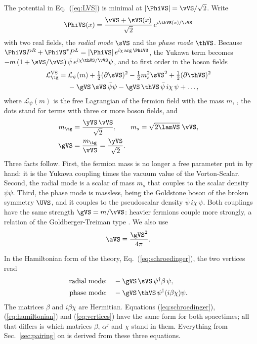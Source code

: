 The potential in Eq.~(\ref{eq:LVS}) is minimal at $|\PhiVS|=\vVS/\sqrt2$. Write
\begin{equation}
\PhiVS(x)=\frac{\vVS+\sVS(x)}{\sqrt2}\,e^{i\thVS(x)/\vVS}
\label{eq:polar}
\end{equation}
with two real fields, the \emph{radial mode} $\sVS$ and the \emph{phase mode} $\thVS$. Because
$\PhiVS P^{R}+\PhiVS^*P^{L}=|\PhiVS|\,e^{i\chi\arg\PhiVS}$, the Yukawa term becomes
$-m\,(1+\sVS/\vVS)\,\bar\psi\,e^{i\chi\thVS/\vVS}\psi$, and to first order in the boson fields
\begin{align}
\mathcal L_{\tg}^{\rm VS}={}&\mathcal L_{\psi}(m)+\tfrac12(\partial\sVS)^2-\tfrac12m_s^2\sVS^2+\tfrac12(\partial\thVS)^2\nonumber\\
&-\gVS\,\sVS\,\bar\psi\psi-\gVS\,\thVS\,\bar\psi\,i\chi\,\psi+\dots,
\label{eq:Lbroken}
\end{align}
where $\mathcal L_{\psi}(m)$ is the free Lagrangian of the fermion field with the mass $m$,
, the dots stand for terms with three or more boson
fields, and
\begin{align}
m_{\tg}&=\frac{\yVS\,\vVS}{\sqrt2},\qquad m_s=\sqrt{2\lamVS}\;\vVS,\nonumber\\
\gVS&=\frac{m_{\tg}}{\vVS}=\frac{\yVS}{\sqrt2}.
\label{eq:masses}
\end{align}
Three facts follow. First, the fermion mass is no longer a free parameter put in by hand: it is the
Yukawa coupling times the vacuum value of the Vorton-Scalar. Second, the radial mode is a scalar of
mass $m_s$ that couples to the scalar density $\bar\psi\psi$. Third, the phase mode is massless, being
the Goldstone boson \cite{Goldstone1961} of the broken symmetry $\UVS$, and it couples to the
pseudoscalar density $\bar\psi\,i\chi\,\psi$. Both couplings have the same strength
$\gVS=m/\vVS$: heavier fermions couple more strongly, a relation of the Goldberger-Treiman type
\cite{GoldbergerTreiman1958}. We also use
\begin{equation}
\aVS\equiv\frac{\gVS^2}{4\pi}.
\label{eq:alphaVS}
\end{equation}

In the Hamiltonian form of the theory, Eq.~(\ref{eq:schroedinger}), the two vertices read
\begin{align}
\text{radial mode:}&\quad-\gVS\,\sVS\,\psi^\dagger\beta\,\psi,\nonumber\\
\text{phase mode:}&\quad-\gVS\,\thVS\,\psi^\dagger(i\beta\chi)\psi .
\label{eq:vertices}
\end{align}
The matrices $\beta$ and $i\beta\chi$ are Hermitian. Equations (\ref{eq:schroedinger}),
(\ref{eq:hamiltonian}) and (\ref{eq:vertices}) have the same form for both spacetimes; all that
differs is which matrices $\beta$, $\alpha^j$ and $\chi$ stand in them. Everything from
Sec.~\ref{sec:pairing} on is derived from these three equations.

